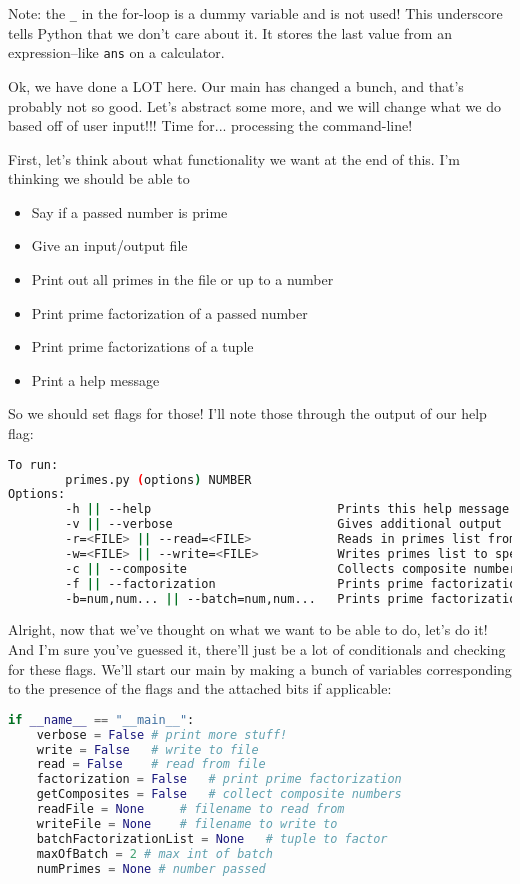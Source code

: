 \documentclass[12pt, twoside, reqno]{book}
\begin{document}
Note: the \texttt{\_} in the for-loop is a dummy variable and is not used! This underscore tells Python that we don't care about it. It stores the last value from an expression--like \texttt{ans} on a calculator.

Ok, we have done a LOT here. Our main has changed a bunch, and that's probably not so good. Let's abstract some more, and we will change what we do based off of user input!!! Time for... processing the command-line!

First, let's think about what functionality we want at the end of this. I'm thinking we should be able to

\begin{itemize}[itemsep=2px, parsep=0pt]
\item Say if a passed number is prime
\item Give an input/output file
\item Print out all primes in the file or up to a number
\item Print prime factorization of a passed number
\item Print prime factorizations of a tuple
\item Print a help message
\end{itemize}

So we should set flags for those! I'll note those through the output of our help flag:
\begin{lstlisting}[language=sh]
To run:
        primes.py (options) NUMBER
Options:
        -h || --help                          Prints this help message
        -v || --verbose                       Gives additional output
        -r=<FILE> || --read=<FILE>            Reads in primes list from specified file (JSON)
        -w=<FILE> || --write=<FILE>           Writes primes list to specified file (JSON)
        -c || --composite                     Collects composite numbers also
        -f || --factorization                 Prints prime factorization of NUMBER
        -b=num,num... || --batch=num,num...   Prints prime factorization of num,num,num...
\end{lstlisting}

Alright, now that we've thought on what we want to be able to do, let's do it! And I'm sure you've guessed it, there'll just be a lot of conditionals and checking for these flags. We'll start our main by making a bunch of variables corresponding to the presence of the flags and the attached bits if applicable:
\begin{lstlisting}[language=Python]
if __name__ == "__main__":
    verbose = False # print more stuff!
    write = False   # write to file
    read = False    # read from file
    factorization = False   # print prime factorization
    getComposites = False   # collect composite numbers
    readFile = None     # filename to read from
    writeFile = None    # filename to write to
    batchFactorizationList = None   # tuple to factor
    maxOfBatch = 2 # max int of batch
    numPrimes = None # number passed
\end{lstlisting}
\end{document}
